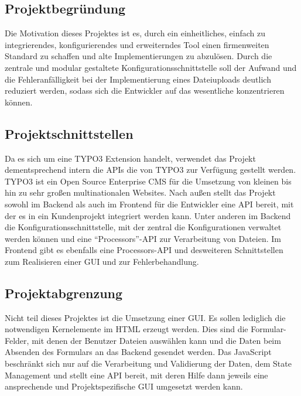 \subsection{Projektbegründung} 
\label{sec:Projektbegruendung}
Die Motivation dieses Projektes ist es, durch ein einheitliches, einfach zu integrierendes, konfigurierendes und erweiterndes Tool einen firmenweiten Standard zu schaffen und alte Implementierungen zu abzulösen. Durch die zentrale und modular gestaltete Konfigurationsschnittstelle soll der Aufwand und die Fehleranfälligkeit bei der Implementierung eines Dateiuploads deutlich reduziert werden, sodass sich die Entwickler auf das wesentliche konzentrieren können.


\subsection{Projektschnittstellen} 
\label{sec:Projektschnittstellen}
Da es sich um eine TYPO3 Extension handelt, verwendet das Projekt dementsprechend intern die APIs die von TYPO3 zur Verfügung gestellt werden. TYPO3 ist ein Open Source Enterprise \ac{CMS} für die Umsetzung von kleinen bis hin zu sehr großen multinationalen Websites. Nach außen stellt das Projekt sowohl im Backend als auch im Frontend für die Entwickler eine API bereit, mit der es in ein Kundenprojekt integriert werden kann. Unter anderen im Backend die Konfigurationsschnittstelle, mit der zentral die Konfigurationen verwaltet werden können und eine ``Processors''-API zur Verarbeitung von Dateien. Im Frontend gibt es ebenfalls eine Processors-API und desweiteren Schnittstellen zum Realisieren einer GUI und zur Fehlerbehandlung.


\subsection{Projektabgrenzung} 
\label{sec:Projektabgrenzung}
Nicht teil dieses Projektes ist die Umsetzung einer GUI. Es sollen lediglich die notwendigen Kernelemente im HTML erzeugt werden. Dies sind die Formular-Felder, mit denen der Benutzer Dateien auswählen kann und die Daten beim Absenden des Formulars an das Backend gesendet werden. Das JavaScript beschränkt sich nur auf die Verarbeitung und Validierung der Daten, dem State Management und stellt eine API bereit, mit deren Hilfe dann jeweils eine ansprechende und Projektspezifische GUI umgesetzt werden kann.
